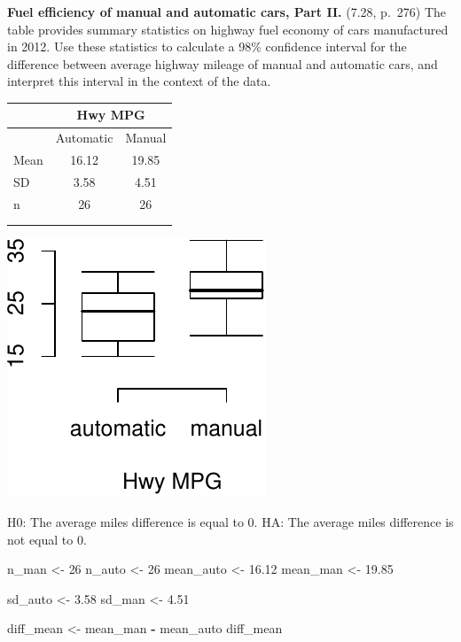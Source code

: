 \documentclass[]{article}
\newenvironment{Shaded}{\begin{snugshade}}{\end{snugshade}}
\newcommand{\DecValTok}[1]{\textcolor[rgb]{0.00,0.00,0.81}{#1}}
\newcommand{\FloatTok}[1]{\textcolor[rgb]{0.00,0.00,0.81}{#1}}
\newcommand{\NormalTok}[1]{#1}
\newcommand{\OperatorTok}[1]{\textcolor[rgb]{0.81,0.36,0.00}{\textbf{#1}}}
\newcommand{\StringTok}[1]{\textcolor[rgb]{0.31,0.60,0.02}{#1}}
\begin{document}
\clearpage

\textbf{Fuel efficiency of manual and automatic cars, Part II.} (7.28,
p.~276) The table provides summary statistics on highway fuel economy of
cars manufactured in 2012. Use these statistics to calculate a 98\%
confidence interval for the difference between average highway mileage
of manual and automatic cars, and interpret this interval in the context
of the data.

\begin{tabular}{l c c }
\hline
        & \multicolumn{2}{c}{Hwy MPG} \\
\hline
            & Automatic     & Manual         \\
Mean    & 16.12         & 19.85          \\
SD      & 3.58          & 4.51           \\
n       & 26            & 26 \\
\hline
& \\
& \\
\end{tabular}

\includegraphics{Homework_7_files/figure-latex/unnamed-chunk-7-1.pdf}

H0: The average miles difference is equal to 0. HA: The average miles
difference is not equal to 0.

\begin{Shaded}
\begin{Highlighting}[]
\NormalTok{n_man <-}\StringTok{ }\DecValTok{26}
\NormalTok{n_auto <-}\StringTok{ }\DecValTok{26}
\NormalTok{mean_auto <-}\StringTok{ }\FloatTok{16.12}
\NormalTok{mean_man <-}\StringTok{ }\FloatTok{19.85}

\NormalTok{sd_auto <-}\StringTok{ }\FloatTok{3.58}
\NormalTok{sd_man <-}\StringTok{ }\FloatTok{4.51}

\NormalTok{diff_mean <-}\StringTok{  }\NormalTok{mean_man }\OperatorTok{-}\StringTok{ }\NormalTok{mean_auto}
\NormalTok{diff_mean}
\end{Highlighting}
\end{Shaded}
\end{document}
